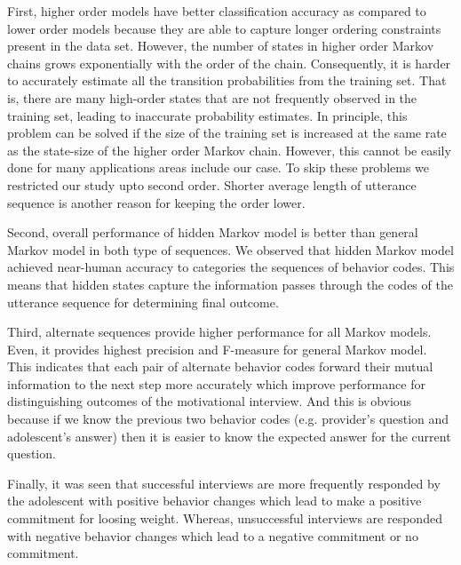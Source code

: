 \documentclass{amia}
\begin{document}
First, higher order models have better classification accuracy as compared to lower order models because they are able to capture longer ordering constraints present in the data set. However, the number of states in higher order Markov chains grows exponentially with the order of the chain. Consequently, it is harder to accurately estimate all the transition probabilities from the training set. That is, there are many high-order states that are not frequently observed in the training set, leading to inaccurate probability estimates. In principle, this problem can be solved if the size of the training set is increased at the same rate as the state-size of the higher order Markov chain. However, this cannot be easily done for many applications areas include our case. To skip these problems we restricted our study upto second order. Shorter average length of utterance sequence is another reason for keeping the order lower.  

Second, overall performance of hidden Markov model is better than general Markov model in both type of sequences. We observed that hidden Markov model achieved near-human accuracy to categories the sequences of behavior codes. This means that hidden states capture the information passes through the codes of the utterance sequence for determining final outcome. 

Third, alternate sequences provide higher performance for all Markov models. Even, it provides highest precision and F-measure for general Markov model. This indicates that each pair of alternate behavior codes forward their mutual information to the next step more accurately which improve performance for distinguishing outcomes of the motivational interview. And this is obvious because if we know the previous two behavior codes (e.g. provider's question and adolescent's answer) then it is easier to know the expected answer for the current question.   

Finally, it was seen that successful interviews are more frequently responded by the adolescent with positive behavior changes which lead to make a positive commitment for loosing weight. Whereas, unsuccessful interviews are responded with negative behavior changes which lead to a negative commitment or no commitment. 
\end{document}
